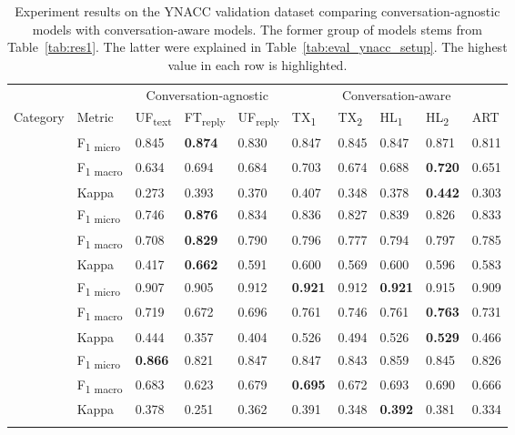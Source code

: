 \begin{table}
\caption{Experiment results on the YNACC validation dataset comparing conversation-agnostic models with conversation-aware models. The former group of models stems from Table~\ref{tab:res1}. The latter were explained in Table~\ref{tab:eval_ynacc_setup}. The highest value in each row is highlighted.}
\begin{tabular}{ l l l l l l l l l l}
\toprule
\multicolumn{2}{l}{} & \multicolumn{3}{c}{Conversation-agnostic} & \multicolumn{5}{c}{Conversation-aware} \\
\cmidrule(r){3-5}
\cmidrule(r){6-10}
Category & Metric & UF\textsubscript{text} & FT\textsubscript{reply} & UF\textsubscript{reply} & TX\textsubscript{1} & TX\textsubscript{2} & HL\textsubscript{1} & HL\textsubscript{2} & ART\\
\midrule
\addlinespace[2ex]
\multirow{3}{*}{Persuasive} & F\textsubscript{1 micro} & 0.845 & \textbf{0.874} & 0.830 & 0.847 & 0.845 & 0.847 & 0.871 & 0.811 \\
& F\textsubscript{1 macro} & 0.634 & 0.694 & 0.684 & 0.703 & 0.674 & 0.688 & \textbf{0.720} & 0.651 \\
& Kappa & 0.273 & 0.393 & 0.370 & 0.407 & 0.348 & 0.378 & \textbf{0.442} & 0.303 \\ \addlinespace[2ex]
\multirow{3}{*}{Audience} & F\textsubscript{1 micro} & 0.746 & \textbf{0.876} & 0.834 & 0.836 & 0.827 & 0.839 & 0.826 & 0.833 \\
& F\textsubscript{1 macro} & 0.708 & \textbf{0.829} & 0.790 & 0.796 & 0.777 & 0.794 & 0.797 & 0.785 \\
& Kappa & 0.417 & \textbf{0.662} & 0.591 & 0.600 & 0.569 & 0.600 & 0.596 & 0.583 \\ \addlinespace[2ex]
\multirow{3}{*}{Agreement} & F\textsubscript{1 micro} & 0.907 & 0.905 & 0.912 & \textbf{0.921} & 0.912 & \textbf{0.921} & 0.915 & 0.909 \\
& F\textsubscript{1 macro} & 0.719 & 0.672 & 0.696 & 0.761 & 0.746 & 0.761 & \textbf{0.763} & 0.731 \\
& Kappa & 0.444 & 0.357 & 0.404 & 0.526 & 0.494 & 0.526 & \textbf{0.529} & 0.466 \\ \addlinespace[2ex]
\multirow{3}{*}{Informative} & F\textsubscript{1 micro} & \textbf{0.866} & 0.821 & 0.847 & 0.847 & 0.843 & 0.859 & 0.845 & 0.826 \\
& F\textsubscript{1 macro} & 0.683 & 0.623 & 0.679 & \textbf{0.695} & 0.672 & 0.693 & 0.690 & 0.666 \\
& Kappa & 0.378 & 0.251 & 0.362 & 0.391 & 0.348 & \textbf{0.392} & 0.381 & 0.334 \\ \addlinespace[2ex]

\end{tabular}
\end{table}
